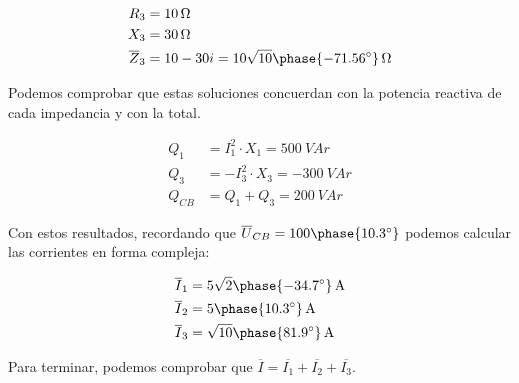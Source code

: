 \documentclass[12pt]{article}
\begin{document}
\begin{enumerate}
\begin{align*}
  R_3 &= \SI{10}{\ohm}\\
  X_3 &= \SI{30}{\ohm}\\
  \overline{Z}_3 &= 10 - 30i = \SI[parse-numbers=false]{10\sqrt{10}\phase{\ang{-71.56}}}{\ohm}
\end{align*}

Podemos comprobar que estas soluciones concuerdan con la potencia
reactiva de cada impedancia y con la total.

\begin{align*}
  Q_1 &= I_1^2 \cdot X_1 = \SI{500}{VA}r\\
  Q_3 &= - I_3^2 \cdot X_3 = \SI{-300}{VA}r\\
  Q_{CB} &= Q_1 + Q_3 =\SI{200}{VA}r
\end{align*}

Con estos resultados, recordando que  $\overline{U}_{CB} =
100\phase{\ang{10.3}}$ podemos calcular las corrientes en forma
compleja:

\begin{align*}
  \overline{I}_1 &=  \SI[parse-numbers=false]{5\sqrt{2}\phase{\ang{-34.7}}}{\ampere}\\
  \overline{I}_2 &=  \SI[parse-numbers=false]{5\phase{\ang{10.3}}}{\ampere}\\
  \overline{I}_3 &=
  \SI[parse-numbers=false]{\sqrt{10}\phase{\ang{81.9}}}{\ampere}
\end{align*}

Para terminar, podemos comprobar que $\overline{I} = \overline{I_1}
+ \overline{I_2} + \overline{I_3}$.
\end{enumerate}

\clearpage{}

\section{}


\end{document}
